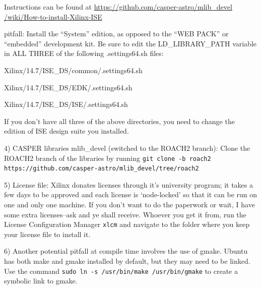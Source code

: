 \documentclass[a4paper,10pt]{article}
\begin{document}
\setlength{\parindent}{1cm}
\hangindent=1.0cm Instructions can be found at
\href{https://github.com/casper-astro/mlib\_devel/wiki/How-to-install-Xilinx-ISE}{https://github.com/casper-astro/mlib\_devel /wiki/How-to-install-Xilinx-ISE}
\vspace{3mm} 

\hangindent=1.0cm pitfall: Install the ``System'' edition, as opposed to the “WEB PACK” or “embedded” development kit. Be sure to edit the LD\_LIBRARY\_PATH variable in ALL THREE of the following .settings64.sh files:
\vspace{3mm} 

\hangindent=1.0cm Xilinx/14.7/ISE\_DS/common/.settings64.sh 

\hangindent=1.0cm Xilinx/14.7/ISE\_DS/EDK/.settings64.sh 

\hangindent=1.0cm Xilinx/14.7/ISE\_DS/ISE/.settings64.sh
\vspace{3mm} 

\hangindent=1.0cm If you don’t have all three of the above directories, you need to change the edition of ISE design suite you installed.
\vspace{3mm} 

\setlength{\parindent}{0.5cm}
\hangindent=1.0cm 4) CASPER libraries mlib\_devel (switched to the ROACH2 branch): Clone the ROACH2 branch of the libraries by running \texttt{git clone -b roach2 https://github.com/casper-astro/mlib\_devel/tree/roach2}
\vspace{3mm} 

\hangindent=1.0cm 5) License file: Xilinx donates licenses through it's university program; it takes a few days to be approved and each license is `node-locked' so that it can be run on one and only one machine. If you don't want to do the paperwork or wait, I have some extra licenses--ask and ye shall receive. Whoever you get it from, run the License Configuration Manager \texttt{xlcm} and navigate to the folder where you keep your license file to install it. 
\vspace{3mm} 

\hangindent=1.0cm 6) Another potential pitfall at compile time involves the use of gmake. Ubuntu has both make and gmake  installed by default, but they may need to be linked. Use the command \texttt{sudo ln -s /usr/bin/make /usr/bin/gmake} to create a symbolic link to gmake.
\end{document}
